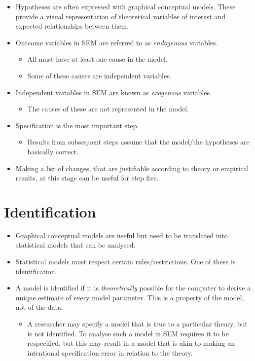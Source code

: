 \documentclass[
]{book}
\providecommand{\tightlist}{%
  \setlength{\itemsep}{0pt}\setlength{\parskip}{0pt}}
\begin{document}
\begin{itemize}
\tightlist
\item
  Hypotheses are often expressed with graphical conceptual models. These provide a visual representation of theoretical variables of interest and expected relationships between them.
\item
  Outcome variables in SEM are referred to as \emph{endogenous} variables.

  \begin{itemize}
  \tightlist
  \item
    All must have at least one cause in the model.
  \item
    Some of these causes are independent variables.
  \end{itemize}
\item
  Independent variables in SEM are known as \emph{exogenous} variables.

  \begin{itemize}
  \tightlist
  \item
    The causes of these are not represented in the model.
  \end{itemize}
\item
  Specification is the most important step.

  \begin{itemize}
  \tightlist
  \item
    Results from subsequent steps assume that the model/the hypotheses are basically correct.
  \end{itemize}
\item
  Making a list of changes, that are justifiable according to theory or empirical results, at this stage can be useful for step five.
\end{itemize}

\section{Identification}\label{identification}

\begin{itemize}
\tightlist
\item
  Graphical conceptual models are useful but need to be translated into statistical models that can be analysed.
\item
  Statistical models must respect certain rules/restrictions. One of these is identification.
\item
  A model is identified if it is \emph{theoretically} possible for the computer to derive a unique estimate of every model parameter. This is a property of the model, not of the data.

  \begin{itemize}
  \tightlist
  \item
    A researcher may specify a model that is true to a particular theory, but is not identified. To analyse such a model in SEM requires it to be respecified, but this may result in a model that is akin to making an intentional specification error in relation to the theory.
  \end{itemize}
\end{itemize}
\end{document}
